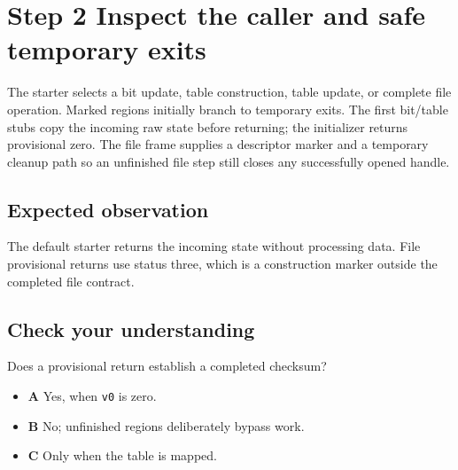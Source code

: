 \section{Step 2 Inspect the caller and safe temporary exits}\label{crc-s02}

The starter selects a bit update, table construction, table update, or complete file operation. Marked regions initially branch to temporary exits. The first bit/table stubs copy the incoming raw state before returning; the initializer returns provisional zero. The file frame supplies a descriptor marker and a temporary cleanup path so an unfinished file step still closes any successfully opened handle.

\subsection{Expected observation}
The default starter returns the incoming state without processing data. File provisional returns use status three, which is a construction marker outside the completed file contract.

\subsection{Check your understanding}
Does a provisional return establish a completed checksum?

\begin{itemize}
  \item \textbf{A} Yes, when \texttt{v0} is zero.
  \item \textbf{B} No; unfinished regions deliberately bypass work.
  \item \textbf{C} Only when the table is mapped.
\end{itemize}
